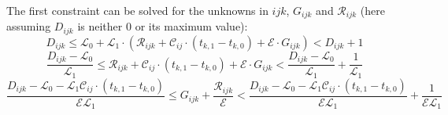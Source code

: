 The first constraint can be solved for the unknowns in $ijk$, $G_{ijk}$ and $\mathcal{R}_{ijk}$ (here assuming $D_{ijk}$ is neither 0 or its maximum value):
\[D_{ijk} \leq \mathcal{L}_0+\mathcal{L}_1 \cdot \left(\mathcal{R}_{ijk} + \mathcal{C}_{ij} \cdot \left(t_{k,1}-t_{k,0}\right) + \mathcal{E}\cdot G_{ijk}\right) < D_{ijk} + 1\]
\[\frac{D_{ijk}-\mathcal{L}_0}{\mathcal{L}_1} \leq\mathcal{R}_{ijk} + \mathcal{C}_{ij} \cdot \left(t_{k,1}-t_{k,0}\right) + \mathcal{E}\cdot G_{ijk} < \frac{D_{ijk} - \mathcal{L}_0}{\mathcal{L}_1} + \frac{1}{\mathcal{L}_1}\]
\[\frac{D_{ijk}-\mathcal{L}_0 - \mathcal{L}_1 \mathcal{C}_{ij} \cdot (t_{k,1} - t_{k,0})}{\mathcal{E}\mathcal{L}_1} \leq G_{ijk} + \frac{\mathcal{R}_{ijk}}{\mathcal{E}} < \frac{D_{ijk}-\mathcal{L}_0 - \mathcal{L}_1 \mathcal{C}_{ij} \cdot (t_{k,1} - t_{k,0})}{\mathcal{E}\mathcal{L}_1} + \frac{1}{\mathcal{E}\mathcal{L}_1}\]



